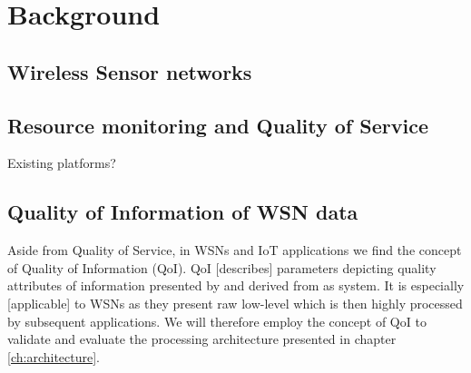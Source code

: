\chapter{Background}
\section{Wireless Sensor networks}
\section{Resource monitoring and Quality of Service} 
Existing platforms?
\section{Quality of Information of WSN data}
\label{sec:back:qoi}
Aside from Quality of Service, in WSNs and IoT applications we find the concept of Quality of Information (QoI). QoI [describes] parameters depicting quality attributes of information presented by and derived from as system. It is especially [applicable] to WSNs as they present raw low-level which is then highly processed by subsequent applications. We will therefore employ the concept of QoI to validate and evaluate the processing architecture presented in chapter \ref{ch:architecture}.

